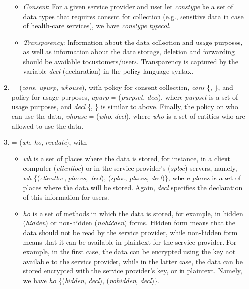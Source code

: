 \documentclass[a4paper]{article}
\begin{document}
\begin{enumerate}
\begin{itemize}
\item \textit{Consent}:  For a given service provider and user  let \textit{constype} be a set of data types that requires consent for collection (e.g., sensitive data in case of health-care services), we have \textit{constype}  \textit{typecol}. 

\item \textit{Transparency}: Information about the data collection and usage purposes, as well as information about the data storage, deletion and forwarding should be available tocustomers/users. Transparency is captured by the variable \textit{decl} (declaration) in the policy language syntax. 

\end{itemize}  

\item  = (\textit{cons}, \textit{upurp}, \textit{whouse}), with  policy for consent collection, \textit{cons}  \{, \}, and policy for usage purposes,  \textit{upurp} = (\textit{purpset}, \textit{decl}), where \textit{purpset} is a set of usage purposes, and \textit{decl}  \{, \} is similar to above. Finally, the policy on who can use the data,  \textit{whouse} = (\textit{who}, \textit{decl}), where \textit{who} is a set of entities who are allowed to use the data.  

\item  = (\textit{wh},  \textit{ho},  \textit{revdate}), with 
\begin{itemize}
\item \textit{wh} is a set of places where the data  is stored, for instance, in a client computer (\textit{clientloc}) or in the service provider's (\textit{sploc}) 
servers, namely, \textit{wh}  \{(\textit{clientloc}, \textit{places}, \textit{decl}), (\textit{sploc}, \textit{places}, \textit{decl})\}, where \textit{places} is a set of places where the data will be stored.  Again, \textit{decl} specifies the declaration of this information for users.     

\item \textit{ho} is a set of methods in which the data  is stored, 
for example, in hidden (\textit{hidden}) or non-hidden (\textit{nohidden}) forms. Hidden form means that the data should not be read by the service provider, while non-hidden form means that it can be available in plaintext for the service provider.  For example, in the first case, the data can be encrypted using the key not available to the service provider, while in the latter case, the data can be stored encrypted with the service provider's key, or in plaintext. Namely, we have \textit{ho}  \{(\textit{hidden}, \textit{decl}), (\textit{nohidden}, \textit{decl})\}.


\end{itemize}
\end{enumerate}
\end{document}
